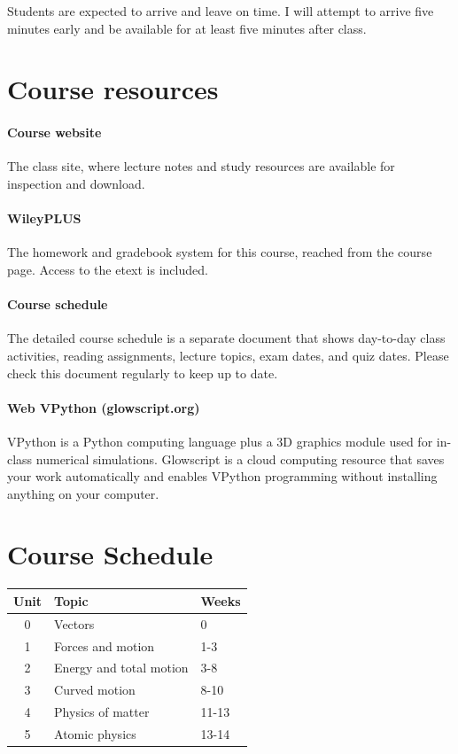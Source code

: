 \documentclass{syllabus}
\begin{document}
Students are expected to arrive and leave on time. I will attempt to arrive five minutes early and be available for at least five minutes after class.

\collegepolicies

\section*{Course resources}

\paragraph{Course website} The class site, where lecture notes and study resources are available for inspection and download.

\paragraph{WileyPLUS} The homework and gradebook system for this course, reached from the course {\lms} page. Access to the etext is included.

\paragraph{Course schedule} The detailed course schedule is a separate document that shows day-to-day class activities, reading assignments, lecture topics, exam dates, and quiz dates. Please check this document regularly to keep up to date.

\paragraph{Web VPython (glowscript.org)} VPython is a Python computing language plus a 3D graphics module used for in-class numerical simulations. Glowscript is a cloud computing resource that saves your work automatically and enables VPython programming without installing anything on your computer.


\section*{Course Schedule}

\noindent\begin{tabular}{cll}
\textbf{Unit} & \textbf{Topic} & \textbf{Weeks} \\ \hline
0 & Vectors                 & 0     \\
1 & Forces and motion       & 1-3   \\
2 & Energy and total motion & 3-8   \\
3 & Curved motion           & 8-10  \\
4 & Physics of matter       & 11-13 \\
5 & Atomic physics          & 13-14
\end{tabular}%
\end{document}
